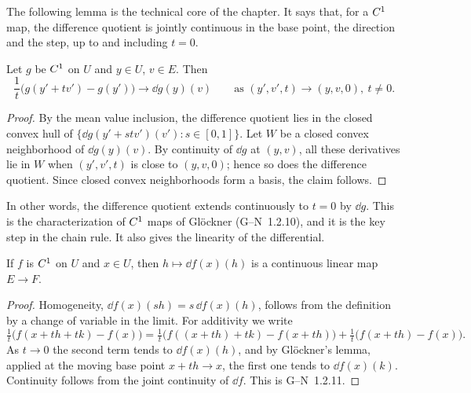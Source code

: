 The following lemma is the technical core of the chapter. It says that, for a $C^{1}$ map, the
difference quotient is jointly continuous in the base point, the direction and the step, up to
and including $t = 0$.

\begin{lemma}[Glöckner]
  \label{lem:glockner}
  \leanok
  Let $g$ be $C^{1}$ on $U$ and $y \in U$, $v \in E$. Then
  \[
    \frac{1}{t}\bigl(g(y' + t v') - g(y')\bigr) \longrightarrow \dd g(y)(v)
    \qquad \text{as } (y', v', t) \to (y, v, 0),\ t \neq 0 .
  \]
\end{lemma}

\begin{proof}
  \leanok
  By the mean value inclusion, the difference quotient lies in the closed convex hull of
  $\{\dd g(y' + s t v')(v') : s \in [0,1]\}$. Let $W$ be a closed convex neighborhood of
  $\dd g(y)(v)$. By continuity of $\dd g$ at $(y, v)$, all these derivatives lie in $W$ when
  $(y', v', t)$ is close to $(y, v, 0)$; hence so does the difference quotient. Since closed
  convex neighborhoods form a basis, the claim follows.
\end{proof}

In other words, the difference quotient extends continuously to $t = 0$ by $\dd g$. This is the
characterization of $C^{1}$ maps of Glöckner \cite{Glo02} (G--N~1.2.10), and it is the key
step in the chain rule. It also gives the linearity of the differential.

\begin{theorem}
  \label{thm:linear}
  \leanok
  If $f$ is $C^{1}$ on $U$ and $x \in U$, then $h \mapsto \dd f(x)(h)$ is a continuous linear
  map $E \to F$.
\end{theorem}

\begin{proof}
  \leanok
  Homogeneity, $\dd f(x)(sh) = s\, \dd f(x)(h)$, follows from the definition by a change of
  variable in the limit. For additivity we write
  \[
    \tfrac{1}{t}\bigl(f(x + th + tk) - f(x)\bigr)
    = \tfrac{1}{t}\bigl(f((x + th) + tk) - f(x + th)\bigr)
      + \tfrac{1}{t}\bigl(f(x + th) - f(x)\bigr) .
  \]
  As $t \to 0$ the second term tends to $\dd f(x)(h)$, and by Glöckner's lemma, applied at the
  moving base point $x + th \to x$, the first one tends to $\dd f(x)(k)$. Continuity follows from
  the joint continuity of $\dd f$. This is G--N~1.2.11.
\end{proof}

